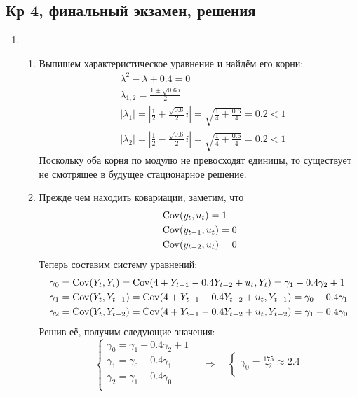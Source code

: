 \documentclass[12pt, a4paper]{article}
\theoremstyle{definition}
\begin{document}
\subsection{Кр 4, финальный экзамен, решения}

\begin{enumerate}
\item
\begin{enumerate}
\item Выпишем характеристическое уравнение и найдём его корни:
\begin{align*}
& \lambda^2 - \lambda + 0.4 = 0 \\
& \lambda_{1,2} = \frac{1 \pm \sqrt{0.6} i}{2} \\
& |\lambda_1| = \left| \frac{1}{2} + \frac{\sqrt{0.6}}{2} i \right| = \sqrt{\frac{1}{4} + \frac{0.6}{4}} = 0.2 < 1 \\
& |\lambda_2| = \left| \frac{1}{2} - \frac{\sqrt{0.6}}{2} i \right| = \sqrt{\frac{1}{4} + \frac{0.6}{4}} = 0.2 < 1
\end{align*}
Поскольку оба корня по модулю не превосходят единицы, то существует не смотрящее в будущее
стационарное решение.
\item Прежде чем находить ковариации, заметим, что
\begin{align*}
& \operatorname{Cov}(y_t, u_t) = 1 \\
& \operatorname{Cov}(y_{t-1}, u_t) = 0 \\
& \operatorname{Cov}(y_{t-2}, u_t) = 0
\end{align*}
Теперь составим систему уравнений:
\begin{align*}
\gamma_0 &= \operatorname{Cov}(Y_t, Y_t) = \operatorname{Cov}(4 + Y_{t-1} - 0.4 Y_{t-2} + u_t, Y_t) = \gamma_1 - 0.4 \gamma_2 + 1 \\
\gamma_1 &= \operatorname{Cov}(Y_t, Y_{t-1}) = \operatorname{Cov}(4 + Y_{t-1} - 0.4 Y_{t-2} + u_t, Y_{t-1}) = \gamma_0 - 0.4 \gamma_1 \\
\gamma_2 &= \operatorname{Cov}(Y_t, Y_{t-2}) = \operatorname{Cov}(4 + Y_{t-1} - 0.4 Y_{t-2} + u_t, Y_{t-2}) = \gamma_1 - 0.4 \gamma_0
\end{align*}
Решив её, получим следующие значения:
\[
\begin{cases}
\gamma_0 = \gamma_1 - 0.4 \gamma_2 + 1 \\
\gamma_1 = \gamma_0 - 0.4 \gamma_1 \\
\gamma_2 = \gamma_1 - 0.4 \gamma_0 \\
\end{cases}
\quad \Rightarrow \quad
\begin{cases}
\gamma_0 = \frac{175}{72} \approx 2.4 \\

\end{cases}\]
\end{enumerate}
\end{enumerate}
\end{document}
